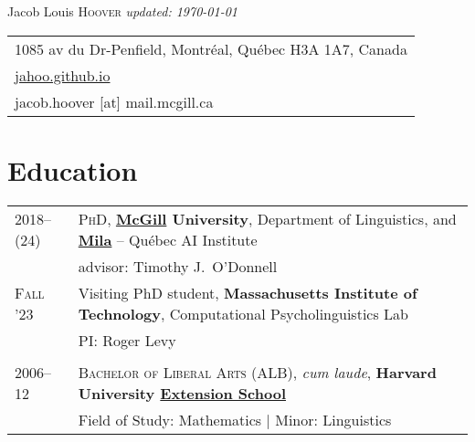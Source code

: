 \documentclass[11pt,a4paper]{article}
\begin{document}
\pagestyle{empty}
\Huge{Jacob Louis \scshape{Hoover}}
\small\textit{\hfill{} updated: \today}

\begin{tabular}{p{\textwidth-12pt}}
  1085 av du Dr-Penfield, Montréal, Québec H3A 1A7, Canada\\
  \href{http://jahoo.github.io}{jahoo.github.io}\\
  jacob.hoover [at] mail.mcgill.ca\\
\end{tabular}

\vspace*{10pt}

\section{Education}

\begin{longtable}{p{1.7cm}|p{15cm}}
  2018--(24)%
    &\textsc{PhD},
     \textbf{\href{https://www.mcgill.ca/linguistics/graduate}{McGill} University},
     Department of Linguistics, and
     \href{http://mila.quebec}{\textbf{Mila}} -- Québec AI Institute\\
    &advisor: Timothy J.\ O'Donnell\\
  \textsc{Fall '23}%
    &Visiting PhD student,
    \textbf{Massachusetts Institute of Technology}, Computational
    Psycholinguistics Lab\\
    &PI: Roger Levy\\
    \multicolumn{2}{c}{}\\
  2006--12%
    &\textsc{Bachelor of Liberal Arts (ALB)}, \emph{cum laude},
     \textbf{Harvard University \href{https://extension.harvard.edu/}{Extension School}}\\
    &Field of Study: Mathematics | Minor: Linguistics
  \end{longtable}
\end{document}
